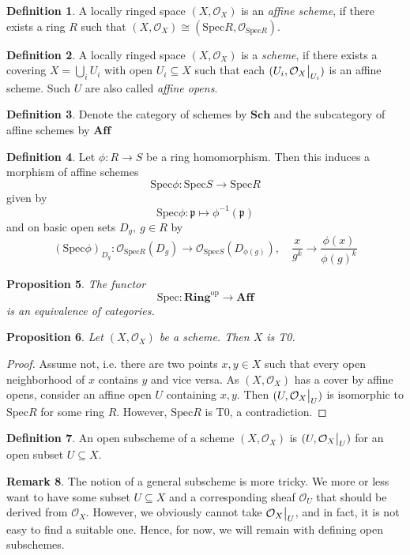 \documentclass{scrartcl}
\newcommand{\p}{\mathfrak{p}}
\newcommand{\Aff}{\mathrm{\textbf{Aff}}}
\newcommand{\Sch}{\mathrm{\textbf{Sch}}}
\newcommand{\Ring}{\mathrm{\textbf{Ring}}}
\newcommand{\Spec}{\mathrm{Spec}}
\renewcommand{\O}{\mathcal{O}}
\newcommand\restr[2]{{
    \left.\kern-\nulldelimiterspace
    #1
    \vphantom{\big|}
    \right|_{#2}
}}
\newtheorem{prop}{Proposition}[section]
\theoremstyle{definition}
\newtheorem{definition}[prop]{Definition}
\newtheorem{remark}[prop]{Remark}
\begin{document}
\begin{definition}
    A locally ringed space $(X, \O_X)$ is an \emph{affine scheme}, if there exists a ring $R$ such that $(X, \O_X) \cong (\Spec R, \O_{\Spec R})$.
\end{definition}
\begin{definition}
    A locally ringed space $(X, \O_X)$ is a \emph{scheme}, if there exists a covering $X = \bigcup_i U_i$ with open $U_i \subseteq X$ such that each $(U_i, \restr{\O_X}{U_i})$ is an affine scheme.
    Such $U$ are also called \emph{affine opens}.
\end{definition}
\begin{definition}
    Denote the category of schemes by $\Sch$ and the subcategory of affine schemes by $\Aff$
\end{definition}
\begin{definition}
    Let $\phi: R \to S$ be a ring homomorphism.
    Then this induces a morphism of affine schemes
    \begin{equation*}
        \Spec\phi: \Spec S \to \Spec R
    \end{equation*}
    given by
    \begin{equation*}
        \Spec\phi: \p \mapsto \phi^{-1}(\p)
    \end{equation*}
    and on basic open sets $D_g, \ g \in R$ by
    \begin{equation*}
        (\Spec\phi)_{D_g}: \O_{\Spec R}(D_g) \to \O_{\Spec S}(D_{\phi(g)}), \quad \frac x {g^k} \to \frac {\phi(x)} {\phi(g)^k}
    \end{equation*}
\end{definition}
\begin{prop}
    The functor
    \begin{equation*}
        \Spec: \Ring^{\mathrm{op}} \to \Aff
    \end{equation*}
    is an equivalence of categories.
\end{prop}
\begin{prop}
    Let $(X, \O_X)$ be a scheme. Then $X$ is T0.
\end{prop}
\begin{proof}
    Assume not, i.e. there are two points $x, y \in X$ such that every open neighborhood of $x$ contains $y$ and vice versa.
    As $(X, \O_X)$ has a cover by affine opens, consider an affine open $U$ containing $x, y$.
    Then $(U, \restr{\O_X}{U})$ is isomorphic to $\Spec R$ for some ring $R$.
    However, $\Spec R$ is T0, a contradiction. 
\end{proof}
\begin{definition}
    An open subscheme of a scheme $(X, \O_X)$ is $(U, \restr{\O_X}{U})$ for an open subset $U \subseteq X$.
\end{definition}
\begin{remark}
    The notion of a general subscheme is more tricky.
    We more or less want to have some subset $U \subseteq X$ and a corresponding sheaf $\O_U$ that should be derived from $\O_X$.
    However, we obviously cannot take $\restr{\O_X}{U}$, and in fact, it is not easy to find a suitable one.
    Hence, for now, we will remain with defining open subschemes. 
\end{remark}
\end{document}
